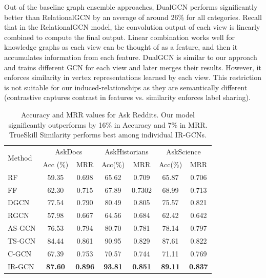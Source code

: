 Out of the baseline graph ensemble approaches, DualGCN performs significantly better than RelationalGCN by an average of around 26\% for all categories. Recall that in the RelationalGCN model, the convolution output of each view is linearly combined to compute the final output. Linear combination works well for knowledge graphs as each view can be thought of as a feature, and then it accumulates information from each feature. DualGCN is similar to our approach and trains different GCN for each view and later merges their results. However, it enforces similarity in vertex representations learned by each view. This restriction is not suitable for our induced-relationships as they are semantically different (contrastive captures contrast in features vs. similarity enforces label sharing).

\begin{table}[tbh]
  \robustify\bfseries
  \centering
  \begin{tabular}{l| c c c c c c}
    \toprule
    \multirow{2}{*}{{Method}} &
      \multicolumn{2}{c}{{AskDocs}} &
      \multicolumn{2}{c}{{AskHistorians}} &
      \multicolumn{2}{c}{{AskScience}} \\
      & {Acc (\%)} & {MRR} & {Acc(\%)} & {MRR} & {Acc(\%)} & {MRR} \\
      \midrule
    RF~\cite{BurelMA16, TianZL13} & 59.35 & 0.698 & 65.62 & 0.709 & 65.87 & 0.706  \\
    FF~\cite{JendersKN16} & 62.30 & 0.715 & 67.89 & 0.7302 & 68.99 & 0.713  \\
    DGCN~\cite{DualGCN} & 77.54 & 0.790 & 80.49 & 0.805 & 75.57 & 0.821 \\
    RGCN~\cite{relationalGCN} & 57.98 & 0.667 & 64.56 & 0.684 & 62.42 & 0.642 \\
    \midrule
    AS-GCN & 76.53 & 0.794 & 80.70 & 0.781 & 78.14 & 0.797 \\
    TS-GCN & 84.44 & 0.861 & 90.95 & 0.829 & 87.61 & 0.822 \\
    C-GCN & 67.39 & 0.753 & 70.57 & 0.744 & 71.11 & 0.769 \\
    IR-GCN & \textbf{87.60} &  \textbf{0.896} &  \textbf{93.81} &  \textbf{0.851} &  \textbf{89.11} &  \textbf{0.837} \\
    \bottomrule
  \end{tabular}
  \caption{\label{tab:reddit} Accuracy and MRR values for Ask\* Reddits. Our model significantly outperforms by 16\% in Accuracy and 7\% in MRR. TrueSkill Similarity performs best among individual IR-GCNs.}
\end{table}

